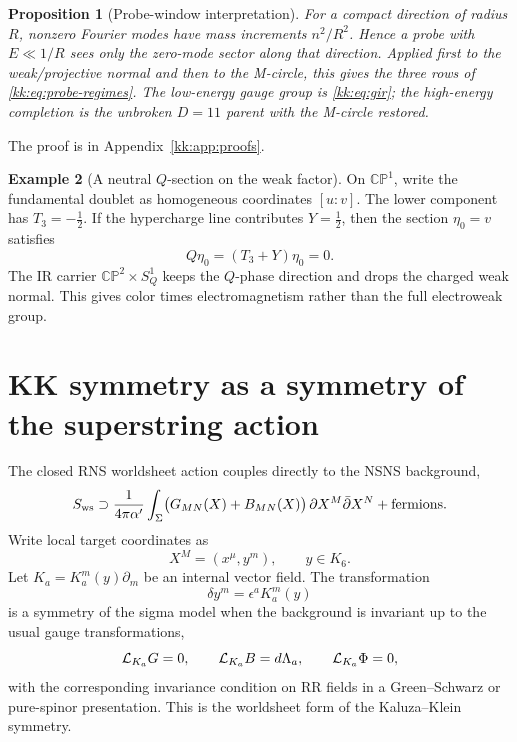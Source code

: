 \documentclass[11pt]{article}
\newcommand{\CP}{\mathbb{CP}}
\theoremstyle{plain}
\newtheorem{proposition}{Proposition}[section]
\theoremstyle{definition}
\newtheorem{example}[proposition]{Example}
\begin{document}
\begin{proposition}[Probe-window interpretation]
\label{kk:prop:probe-windows}
For a compact direction of radius \(R\), nonzero Fourier modes have mass
increments \(n^2/R^2\).  Hence a probe with \(E\ll 1/R\) sees only the zero-mode
sector along that direction.  Applied first to the weak/projective normal and
then to the M-circle, this gives the three rows of \eqref{kk:eq:probe-regimes}.
The low-energy gauge group is \eqref{kk:eq:gir}; the high-energy completion is the
unbroken \(D=11\) parent with the M-circle restored.
\end{proposition}
The proof is in Appendix~\ref{kk:app:proofs}.

\begin{example}[A neutral \(Q\)-section on the weak factor]
\label{kk:ex:q-section}
On \(\CP^1\), write the fundamental doublet as homogeneous coordinates
\([u:v]\).  The lower component has \(T_3=-\tfrac12\).  If the hypercharge line
contributes \(Y=\tfrac12\), then the section \(\eta_0=v\) satisfies
\[
  Q\eta_0=(T_3+Y)\eta_0=0 .
\]
The IR carrier \(\CP^2\times S^1_Q\) keeps the \(Q\)-phase direction and drops
the charged weak normal.  This gives color times electromagnetism rather than
the full electroweak group.
\end{example}

\section{KK symmetry as a symmetry of the superstring action}
\label{kk:sec:kk-symmetry}

The closed RNS worldsheet action couples directly to the NSNS background,
\begin{equation}
  S_{\rm ws}\supset \frac{1}{4\pi\alpha'}\int_\Sigma
  \bigl(G_{MN}(X)+B_{MN}(X)\bigr)\,
  \partial X^M\bar\partial X^N+\hbox{fermions}.
  \label{kk:eq:rns}
\end{equation}
Write local target coordinates as
\begin{equation}
  X^M=(x^\mu,y^m),\qquad y\in K_6 .
\end{equation}
Let \(K_a=K_a^m(y)\partial_m\) be an internal vector field.  The transformation
\begin{equation}
  \delta y^m=\epsilon^aK_a^m(y)
  \label{kk:eq:worldsheet-sym}
\end{equation}
is a symmetry of the sigma model when the background is invariant up to the
usual gauge transformations,
\begin{equation}
  {\cal L}_{K_a}G=0,\qquad
  {\cal L}_{K_a}B=d\Lambda_a,\qquad
  {\cal L}_{K_a}\Phi=0,
  \label{kk:eq:nsns-invariance}
\end{equation}
with the corresponding invariance condition on RR fields in a Green--Schwarz or
pure-spinor presentation.  This is the worldsheet form of the Kaluza--Klein
symmetry.
\end{document}
